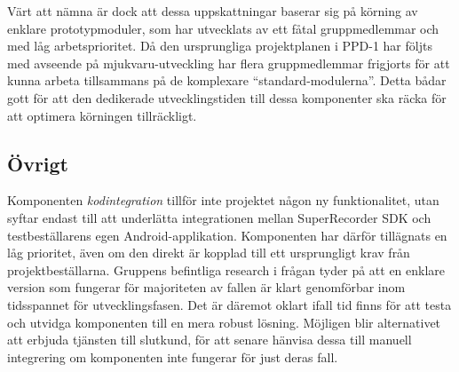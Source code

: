 Värt att nämna är dock att dessa uppskattningar baserar sig på körning av enklare prototypmoduler, som har utvecklats av ett fåtal gruppmedlemmar och med låg arbetsprioritet. Då den ursprungliga projektplanen i PPD-1 har följts med avseende på mjukvaru-utveckling har flera gruppmedlemmar frigjorts för att kunna arbeta tillsammans på de komplexare ``standard-modulerna''. Detta bådar gott för att den dedikerade utvecklingstiden till dessa komponenter ska räcka för att optimera körningen tillräckligt.

\subsection{Övrigt} %
\label{sub:Ovrigt}

Komponenten \textit{kodintegration} tillför inte projektet någon ny funktionalitet, utan syftar endast till att underlätta integrationen mellan SuperRecorder SDK och testbeställarens egen Android-applikation. Komponenten har därför tillägnats en låg prioritet, även om den direkt är kopplad till ett ursprungligt krav från projektbeställarna. Gruppens befintliga research i frågan tyder på att en enklare version som fungerar för majoriteten av fallen är klart genomförbar inom tidsspannet för utvecklingsfasen. Det är däremot oklart ifall tid finns för att testa och utvidga komponenten till en mera robust lösning. Möjligen blir alternativet att erbjuda tjänsten till slutkund, för att senare hänvisa dessa till manuell integrering om komponenten inte fungerar för just deras fall.


